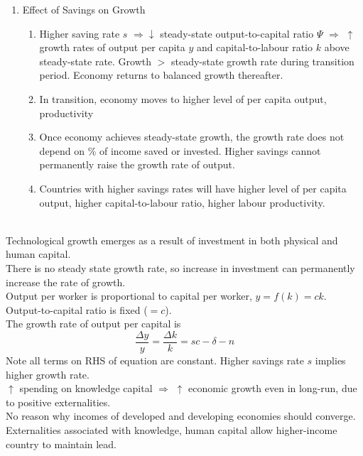 \begin{remark}
\begin{enumerate}[label=\roman*.]
\begin{enumerate}[label=\arabic*.]
\end{enumerate}
\item Effect of Savings on Growth
\begin{enumerate}[label=\arabic*.]
\setlength{\itemsep}{0pt}
\item Higher saving rate $s$ $\Rightarrow \downarrow$ steady-state output-to-capital ratio $\Psi$ $\Rightarrow$ $\uparrow$ growth rates of output per capita $y$ and capital-to-labour ratio $k$ above steady-state rate. Growth $>$ steady-state growth rate during transition period. Economy returns to balanced growth thereafter.
\item In transition, economy moves to higher level of per capita output, productivity
\item Once economy achieves steady-state growth, the growth rate does not depend on \% of income saved or invested. Higher savings cannot permanently raise the growth rate of output.
\item Countries with higher savings rates will have higher level of per capita output, higher capital-to-labour ratio, higher labour productivity.
\end{enumerate}
\end{enumerate}
\end{remark}

\begin{definition} \\
Technological growth emerges as a result of investment in both physical and human capital.\\
There is no steady state growth rate, so increase in investment can permanently increase the rate of growth.\\
Output per worker is proportional to capital per worker, $y=f(k)=ck$. Output-to-capital ratio is fixed ($=c$).\\
The growth rate of output per capital is 
\begin{equation}
\frac{\Delta y}{y} = \frac{\Delta k}{k} = sc - \delta - n \nonumber
\end{equation}
Note all terms on RHS of equation are constant. Higher savings rate $s$ implies higher growth rate.\\
$\uparrow$ spending on knowledge capital $\Rightarrow$ $\uparrow$ economic growth even in long-run, due to positive externalities.\\
No reason why incomes of developed and developing economies should converge.\\
Externalities associated with knowledge, human capital allow higher-income country to maintain lead.
\end{definition}

